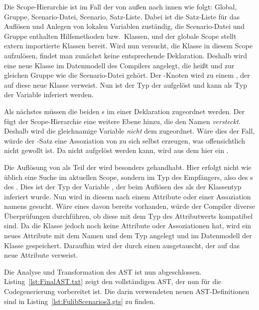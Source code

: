 Die Scope-Hierarchie ist im Fall der  von außen nach innen wie folgt:
Global, Gruppe, Scenario-Datei, Scenario, Satz-Liste.
Dabei ist die Satz-Liste für das Auflösen und Anlegen von lokalen Variablen zuständig,
die Scenario-Datei und Gruppe enthalten Hilfsmethoden bzw.\ Klassen,
und der globale Scope stellt extern importierte Klassen bereit.
Wird nun versucht, die Klasse  in diesem Scope aufzulösen,
findet man zunächst keine entsprechende Deklaration.
Deshalb wird eine neue Klasse im Datenmodell des Compilers angelegt,
die  heißt und zur gleichen Gruppe wie die Scenario-Datei gehört.
Der -Knoten wird zu einem , der auf diese neue Klasse verweist.
Nun ist der Typ der  aufgelöst und kann als Typ der Variable  inferiert werden.

Als nächstes müssen die beiden s im  einer Deklaration zugeordnet werden.
Der  fügt der Scope-Hierarchie eine weitere Ebene hinzu, die den Namen  \emph{versteckt}.
Deshalb wird die gleichnamige Variable \emph{nicht} dem  zugeordnet.
Wäre dies der Fall, würde der -Satz eine Assoziation von  zu sich selbst erzeugen,
was offensichtlich nicht gewollt ist.
Da  nicht aufgelöst werden kann, wird aus dem  hier ein .

Die Auflösung von  als Teil der  wird besonders gehandhabt.
Hier erfolgt nicht wie üblich eine Suche im aktuellen Scope,
sondern im Typ des Empfängers, also des s des .
Dies ist der Typ der Variable , der beim Auflösen des  als der Klassentyp  inferiert wurde.
Nun wird in diesem nach einem Attribute oder einer Assoziation namens  gesucht.
Wäre eines davon bereits vorhanden, würde der Compiler diverse Überprüfungen durchführen,
ob diese mit dem Typ des Attributwerts kompatibel sind.
Da die Klasse  jedoch noch keine Attribute oder Assoziationen hat,
wird ein neues Attribute mit dem Namen  und dem Typ  angelegt
und im Datenmodell der Klasse  gespeichert.
Daraufhin wird der  durch einen  ausgetauscht,
der auf das neue Attribute verweist.

Die Analyse und Transformation des AST ist nun abgeschlossen.
Listing~\ref{lst:FinalAST.txt} zeigt den vollständigen AST, der nun für die Codegenerierung vorbereitet ist.
Die darin verwendeten neuen AST-Definitionen sind in Listing~\ref{lst:FulibScenarios3.gts} zu finden.

